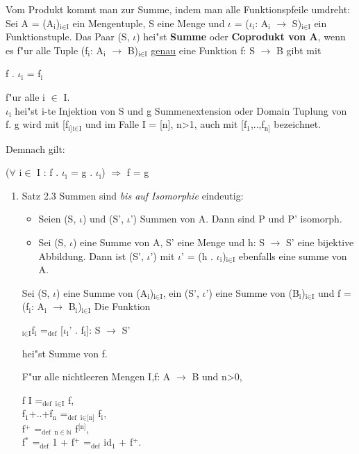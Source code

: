 \documentclass[11pt]{article}
\begin{document}
Vom Produkt kommt man zur Summe, indem man alle Funktionspfeile umdreht:
Sei A = (A$_{\text{i}}$)$_{\text{i} \in \text{I}}$ ein Mengentuple, S eine Menge und $\iota$ = ($\iota$$_{\text{i}}$: A$_{\text{i}}$ $\to$ S)$_{\text{i} \in \text{I}}$ ein Funktionstuple.
Das Paar (S, $\iota$) hei"st \textbf{Summe} oder \textbf{Coprodukt von A}, wenn es f"ur alle Tuple (f$_{\text{i}}$: A$_{\text{i}}$ $\to$ B)$_{\text{i} \in \text{I}}$ \uline{genau} eine Funktion
f: S $\to$ B gibt mit 
\begin{center}
f . $\iota$$_{\text{i}}$ = f$_{\text{i}}$
\end{center}
f"ur alle i $\in$ I. \\

$\iota$$_{\text{i}}$ hei"st i-te Injektion von S und g Summenextension oder Domain Tuplung von f. g wird mit [f$_{\text{i]}}$$_{\text{i} \in \text{I}}$ und im Falle I = [n],
n>1, auch mit [f$_{\text{1}}$,..,f$_{\text{n]}}$ bezeichnet. 

Demnach gilt:


\begin{center}
($\forall$ i$\in$ I : f . $\iota$$_{\text{i}}$ = g . $\iota$$_{\text{i}}$) $\Rightarrow$ f = g
\end{center}

\begin{enumerate}
\item Satz 2.3 Summen sind \emph{bis auf Isomorphie} eindeutig:
\label{sec-2-3-2-1}
\begin{itemize}
\item Seien (S, $\iota$) und (S', $\iota$') Summen von A. Dann sind P und P' isomorph.
\item Sei (S, $\iota$) eine Summe von A, S' eine Menge und h: S $\to$ S' eine bijektive Abbildung. Dann ist (S', $\iota$') mit $\iota$' = (h . $\iota$$_{\text{i}}$)$_{\text{i} \in \text{I}}$ ebenfalls eine summe von A.
\end{itemize}

Sei (S, $\iota$) eine Summe von (A$_{\text{i}}$)$_{\text{i} \in \text{I}}$, ein (S', $\iota$') eine Summe von (B$_{\text{i}}$)$_{\text{i} \in \text{I}}$ und f = (f$_{\text{i}}$: A$_{\text{i}}$ $\to$ B$_{\text{i}}$)$_{\text{i} \in \text{I}}$
Die Funktion
\begin{center}
\amalg$_{\text{i} \in \text{I}}$f$_{\text{i}}$ =$_{\text{def}}$ [$\iota$$_{\text{i}}$' . f$_{\text{i}}$]: S $\to$ S' 
\end{center}
hei"st Summe von f.


F"ur alle nichtleeren Mengen I,f: A $\to$ B und n>0,
\begin{center}
f \texttimes{} I =$_{\text{def}}$ \amalg$_{\text{i} \in \text{I}}$ f, \\
f$_{\text{1}}$+..+f$_{\text{n}}$ =$_{\text{def}}$ \amalg$_{\text{i} \in \text{[n]}}$ f$_{\text{i}}$, \\
f$^{\text{+}}$ =$_{\text{def}}$ \amalg$_{\text{n} \in \mathbb{N}}$ f$^{\text{[n]}}$, \\
f$^{\text{*}}$ =$_{\text{def}}$ 1 + f$^{\text{+}}$ =$_{\text{def}}$ id$_{\text{1}}$ + f$^{\text{+}}$. \\
\end{center}
\end{enumerate}
\end{document}
